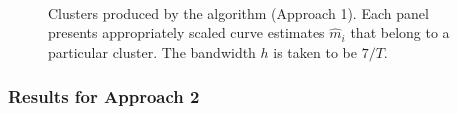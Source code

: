 \documentclass[a4paper,12pt]{article}
\numberwithin{equation}{section}
\begin{document}
\begin{figure}
\\
\hspace{0.25cm}
\caption{Clusters produced by the algorithm (Approach 1). Each panel presents appropriately scaled curve estimates $\hat{m}_i$ that belong to a particular cluster. The bandwidth $h$ is taken to be $7/T$.}\label{fig:clusters_14days}
\vspace{1cm}

\end{figure}


\FloatBarrier 


\subsubsection{Results for Approach 2}
\end{document}
